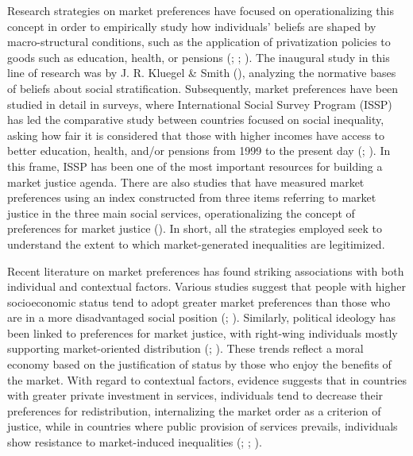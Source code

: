 \documentclass[
  12pt,
]{article}
\begin{document}
Research strategies on market preferences have focused on
operationalizing this concept in order to empirically study how
individuals' beliefs are shaped by macro-structural conditions, such as
the application of privatization policies to goods such as education,
health, or pensions (; ;
). The inaugural study in
this line of research was by J. R. Kluegel \& Smith
(), analyzing the normative
bases of beliefs about social stratification. Subsequently, market
preferences have been studied in detail in surveys, where International
Social Survey Program (ISSP) has led the comparative study between
countries focused on social inequality, asking how fair it is considered
that those with higher incomes have access to better education, health,
and/or pensions from 1999 to the present day
(;
). In this frame, ISSP has
been one of the most important resources for building a market justice
agenda. There are also studies that have measured market preferences
using an index constructed from three items referring to market justice
in the three main social services, operationalizing the concept of
preferences for market justice
(). In short, all the strategies employed seek to understand the
extent to which market-generated inequalities are legitimized.

Recent literature on market preferences has found striking associations
with both individual and contextual factors. Various studies suggest
that people with higher socioeconomic status tend to adopt greater
market preferences than those who are in a more disadvantaged social
position (;
). Similarly, political
ideology has been linked to preferences for market justice, with
right-wing individuals mostly supporting market-oriented distribution
(; ). These
trends reflect a moral economy based on the justification of status by
those who enjoy the benefits of the market. With regard to contextual
factors, evidence suggests that in countries with greater private
investment in services, individuals tend to decrease their preferences
for redistribution, internalizing the market order as a criterion of
justice, while in countries where public provision of services prevails,
individuals show resistance to market-induced inequalities
(;
;
).
\end{document}
